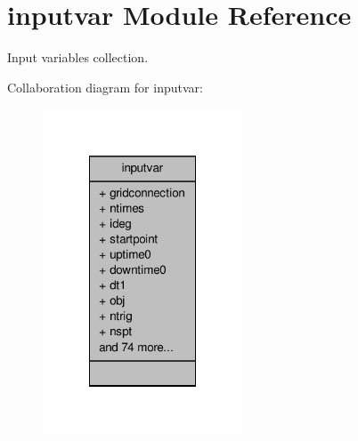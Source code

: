 \hypertarget{classinputvar}{\section{inputvar Module Reference}
\label{classinputvar}
}


Input variables collection.  




Collaboration diagram for inputvar\-:
\nopagebreak
\begin{figure}[H]
\begin{center}
\leavevmode
\includegraphics[width=168pt]{classinputvar__coll__graph}
\end{center}
\end{figure}
